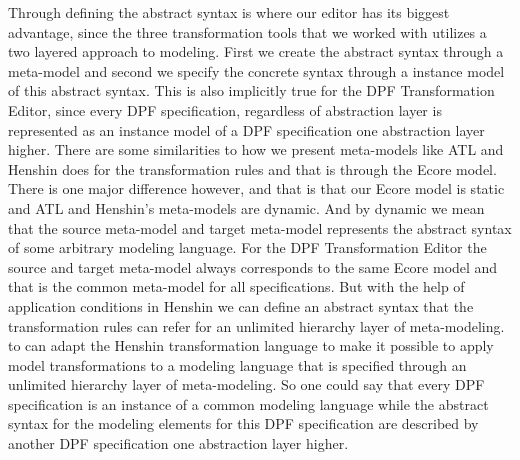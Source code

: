 Through defining the abstract syntax is where our editor has its biggest
advantage, since the three transformation tools that we worked with utilizes a
two layered approach to modeling. First we create the abstract syntax through a
meta-model and second we specify the concrete syntax through a instance model
of this abstract syntax. This is also implicitly true for the DPF Transformation
Editor, since every DPF specification, regardless of abstraction layer is
represented as an instance model of a DPF specification one abstraction layer
higher. There are some similarities to how we present meta-models like ATL and
Henshin does for the transformation rules and that is through the Ecore model.
There is one major difference however, and that is that our Ecore model is
static and ATL and Henshin's meta-models are dynamic. And by dynamic we mean
that the source meta-model and target meta-model represents the abstract syntax
of some arbitrary modeling language. For the DPF Transformation Editor the
source and target meta-model always corresponds to the same Ecore model and that
is the common meta-model for all specifications. But with the help of
application conditions in Henshin we can define an abstract syntax that the
transformation rules can refer for an unlimited hierarchy layer of
meta-modeling. to can adapt the Henshin transformation language to make it
possible to apply model transformations to a modeling language that is
specified through an unlimited hierarchy layer of meta-modeling. So one could
say that every DPF specification is an instance of a common modeling language
while the abstract syntax for the modeling elements for this DPF specification
are described by another DPF specification one abstraction layer higher.


